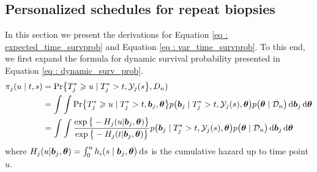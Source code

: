 
\subsection{Personalized schedules for repeat biopsies}
In this section we present the derivations for Equation \ref{eq : expected_time_survprob} and Equation \ref{eq : var_time_survprob}. To this end, we first expand the formula for dynamic survival probability presented in Equation \ref{eq : dynamic_surv_prob}.
\begin{equation}
\label{eq : dyn_surv_prob_expanded}
\begin{split}
\pi_j(u \mid t, s) &= \mbox{Pr}\big\{T^*_j \geq u \mid  T^*_j >t, \mathcal{Y}_j(s\big\}, D_n)\\
&= \int \int \mbox{Pr}\big\{T^*_j \geq u \mid  T^*_j >t, \boldsymbol{b}_j,\boldsymbol{\theta}\big\} p\big(\boldsymbol{b}_j \mid T^*_j>t, \mathcal{Y}_j(s), \boldsymbol{\theta}\big)p\big(\boldsymbol{\theta} \mid \mathcal{D}_n\big) \diff \boldsymbol{b}_j \diff \boldsymbol{\theta}\\
&= \int \int \frac{\exp\big\{-H_j(u | \boldsymbol{b}_j, \boldsymbol{\theta})\big\}}{\exp\big\{-H_j(t | \boldsymbol{b}_j, \boldsymbol{\theta})\big\}} p\big(\boldsymbol{b}_j \mid T^*_j>t, \mathcal{Y}_j(s), \boldsymbol{\theta}\big)p\big(\boldsymbol{\theta} \mid \mathcal{D}_n\big) \diff \boldsymbol{b}_j \diff \boldsymbol{\theta}
\end{split}
\end{equation}
where $H_j(u | \boldsymbol{b}_j, \boldsymbol{\theta}) = \int_0^u h_i(s \mid \boldsymbol{b}_j, \boldsymbol{\theta}\big)\mathop{}\!\mathrm{d} s$ is the cumulative hazard up to time point $u$.

